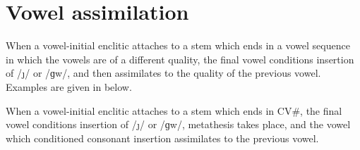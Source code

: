 \section{Vowel assimilation}\label{sec:VowAss ch:PhoMet}
When a vowel-initial enclitic attaches to a stem which ends in a vowel sequence
in which the vowels are of a different quality,
the final vowel conditions insertion of /\j/ or /ɡw/,
and then assimilates to the quality of the previous vowel.
Examples are given in  below.

\begin{exe}
	\label{ex:VaVb+=V->VaVaCb=V}
\end{exe}

When a vowel-initial enclitic attaches to a stem which ends in CV{\#},
the final vowel conditions insertion of /\j/ or /ɡw/,
metathesis takes place, and the vowel which conditioned consonant
insertion assimilates to the previous vowel.

